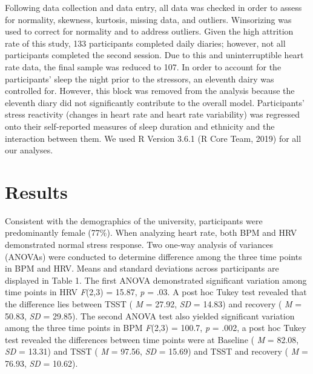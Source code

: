 \documentclass[man, fleqn, noextraspace]{apa6}
\begin{document}
Following data collection and data entry, all data was checked in order to assess for normality, skewness, kurtosis, missing data, and outliers. Winsorizing was used to correct for normality and to address outliers. Given the high attrition rate of this study, 133 participants completed daily diaries; however, not all participants completed the second session. Due to this and uninterruptible heart rate data, the final sample was reduced to 107. In order to account for the participants' sleep the night prior to the stressors, an eleventh dairy was controlled for. However, this block was removed from the analysis because the eleventh diary did not significantly contribute to the overall model. Participants' stress reactivity (changes in heart rate and heart rate variability) was regressed onto their self-reported measures of sleep duration and ethnicity and the interaction between them. We used R Version 3.6.1 (R Core Team, 2019) for all our analyses.

\hypertarget{results}{%
\section{Results}\label{results}}

Consistent with the demographics of the university, participants were predominantly female (77\%). When analyzing heart rate, both BPM and HRV demonstrated normal stress response. Two one-way analysis of variances (ANOVAs) were conducted to determine difference among the three time points in BPM and HRV. Means and standard deviations across participants are displayed in Table 1. The first ANOVA demonstrated significant variation among time points in HRV \emph{F}(2,3) = 15.87, \emph{p} = .03. A post hoc Tukey test revealed that the difference lies between TSST ( \emph{M} = 27.92, \emph{SD} = 14.83) and recovery ( \emph{M} = 50.83, \emph{SD} = 29.85). The second ANOVA test also yielded significant variation among the three time points in BPM \emph{F}(2,3) = 100.7, \emph{p} = .002, a post hoc Tukey test revealed the differences between time points were at Baseline ( \emph{M} = 82.08, \emph{SD} = 13.31) and TSST ( \emph{M} = 97.56, \emph{SD} = 15.69) and TSST and recovery ( \emph{M} = 76.93, \emph{SD} = 10.62).
\end{document}
